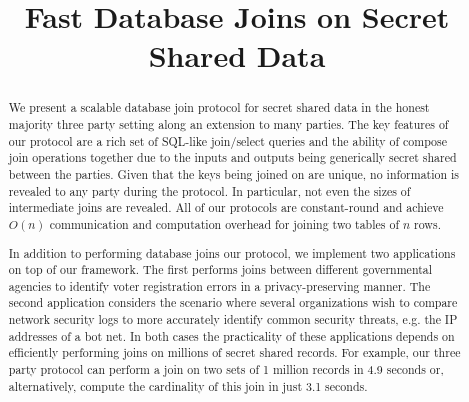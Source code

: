 \documentclass[11pt,letterpaper]{article}
\title{Fast Database Joins on Secret Shared Data}
\begin{document}
\maketitle

\begin{abstract}
We present a scalable database join protocol for secret shared data in the honest majority three party setting along an extension to many parties. The key features of our protocol are a rich set of SQL-like join/select queries and the ability of compose join operations together due to the inputs and outputs being generically secret shared between the parties. Given that the keys being joined on are unique, no information is revealed to any party during the protocol. In particular, not even the sizes of intermediate joins are revealed. All of our protocols are constant-round and achieve $O(n)$ communication and computation overhead for joining two tables of $n$ rows. 

In addition to performing database joins our protocol, we implement two applications on top of our framework. The first performs joins between different governmental agencies to identify voter registration errors in a privacy-preserving manner. The second application considers the scenario where several organizations wish to compare network security logs to more accurately identify common security threats, e.g. the IP addresses of a bot net. In both cases the practicality of these applications depends on efficiently performing joins on millions of secret shared records. For example, our three party protocol can perform a join on two sets of 1 million records in 4.9 seconds or, alternatively, compute the cardinality of this join in just 3.1 seconds. 
\end{abstract}




















\appendix

\end{document}
